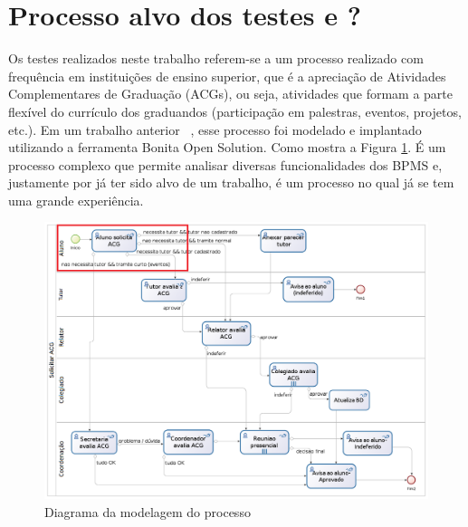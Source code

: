 \documentclass[12pt]{article}
\begin{document}






\section{Processo alvo dos testes e ?}
Os testes realizados neste trabalho referem-se a um processo realizado com frequência em instituições de ensino superior, que é a apreciação de Atividades Complementares de Graduação (ACGs), ou seja, atividades que formam a parte flexível do currículo dos graduandos (participação em palestras, eventos, projetos, etc.). Em um trabalho anterior ~\cite{sbsi2013}, esse processo foi modelado e implantado utilizando a ferramenta Bonita Open Solution. Como mostra a Figura \ref{fig:diagrama}. É um processo complexo que permite analisar diversas funcionalidades dos BPMS e, justamente por já ter sido alvo de um trabalho, é um processo no qual já se tem uma grande experiência.

\begin{figure}[ht]
\centering
\includegraphics[width=.99\textwidth]{imagens/processo.png}
\caption{Diagrama da modelagem do processo}
\label{fig:diagrama}
\end{figure}
\end{document}
